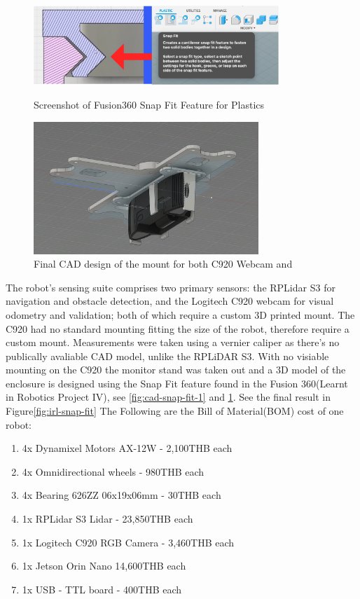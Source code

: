 \begin{figure}[!htb]
    \begin{minipage}{0.41\textwidth}
        \includegraphics[height=3cm]{assets/images/hardware/cad-snapfit.png}
        \caption{Screenshot of Fusion360 Snap Fit Feature for Plastics}
        \label{fig:cad-snap-fit-1}
    \end{minipage}
    \hspace{0.1\textwidth} %
    \begin{minipage}{0.41\textwidth}
        \includegraphics[height=5cm]{assets/images/hardware/cad-camera-mount.png}
        \caption{Final CAD design of the mount for both C920 Webcam and }
        \label{fig:cad-snap-fit-2}
    \end{minipage}
\end{figure}
The robot’s sensing suite comprises two primary sensors: the RPLidar S3 for navigation and obstacle detection, and the Logitech C920 webcam for visual odometry and validation; both of which require a custom 3D printed mount. 
The C920 had no standard mounting fitting the size of the robot, therefore require a custom mount. Measurements were taken using a vernier caliper as there's no publically avaliable CAD model, unlike the RPLiDAR S3. With no visiable mounting on the C920 the monitor stand was taken out and a 3D model of the enclosure is designed using the Snap Fit feature found in the Fusion 360(Learnt in Robotics Project IV), see \ref{fig:cad-snap-fit-1} and \ref{fig:cad-snap-fit-2}. See the final result in Figure\ref{fig:irl-snap-fit}
The Following are the Bill of Material(BOM) cost of one robot: 
\begin{enumerate}
    \item 4x Dynamixel Motors AX-12W - 2,100THB each
    \item 4x Omnidirectional wheels - 980THB each 
    \item 4x Bearing 626ZZ 06x19x06mm - 30THB each
    \item 1x RPLidar S3 Lidar - 23,850THB each 
    \item 1x Logitech C920 RGB Camera - 3,460THB each
    \item 1x Jetson Orin Nano 14,600THB each
    \item 1x USB - TTL board - 400THB each
\end{enumerate}
